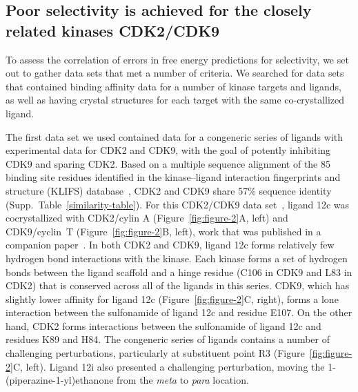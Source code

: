 \documentclass[phd,tocprelim]{cornell}
\begin{document}
\subsection{Poor selectivity is achieved for the closely related kinases CDK2/CDK9}

To assess the correlation of errors in free energy predictions for selectivity, we set out to gather data sets that met a number of criteria. 
We searched for data sets that contained binding affinity data for a number of kinase targets and ligands, as well as having crystal structures for each target with the same co-crystallized ligand. 

The first data set we used contained data for a congeneric series of ligands with experimental data for CDK2 and CDK9, with the goal of potently inhibiting CDK9 and sparing CDK2. 
Based on a multiple sequence alignment of the 85 binding site residues identified in the kinase–ligand interaction fingerprints and structure (KLIFS) database~\cite{Kooistra:2016fr,vanLinden:2014ea}, CDK2 and CDK9 share 57\% sequence identity (Supp.\ Table~\ref{similarity-table}).   
For this CDK2/CDK9 data set~\citep{Shao2013-oe}, ligand 12c was cocrystallized with CDK2/cylin A (Figure~\ref{fig:figure-2}A, left) and CDK9/cyclin~T (Figure~\ref{fig:figure-2}B, left), work that was published in a companion paper~\citep{Hole2013-sr}. 
In both CDK2 and CDK9, ligand 12c forms relatively few hydrogen bond interactions with the kinase. 
Each kinase forms a set of hydrogen bonds between the ligand scaffold and a hinge residue (C106 in CDK9 and L83 in CDK2) that is conserved across all of the ligands in this series. 
CDK9, which has slightly lower affinity for ligand 12c (Figure~\ref{fig:figure-2}C, right), forms a lone interaction between the sulfonamide of ligand 12c and residue E107. 
On the other hand, CDK2 forms interactions between the sulfonamide of ligand 12c and residues K89 and H84. 
The congeneric series of ligands contains a number of challenging perturbations, particularly at substituent point R3 (Figure~\ref{fig:figure-2}C, left). Ligand 12i also presented a challenging perturbation, moving the 1-(piperazine-1-yl)ethanone from the \emph{meta} to \emph{para} location. 
\end{document}
